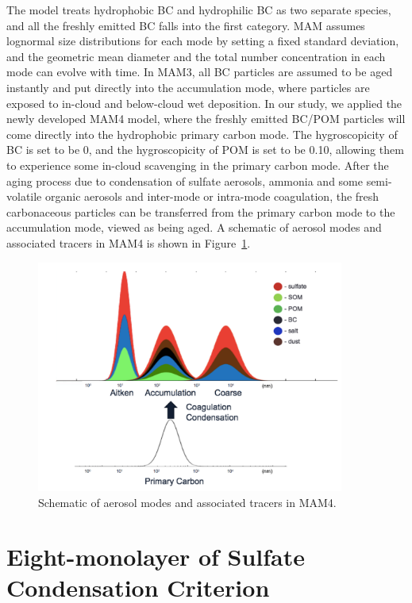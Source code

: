 \documentclass[12pt, fullpage]{uiucthesis2009}
\begin{document}
	
	The model treats hydrophobic BC and hydrophilic BC as two separate species, and all the freshly emitted BC falls into the first category. MAM assumes lognormal size distributions for each mode by setting a fixed standard deviation, and the geometric mean diameter and the total number concentration in each mode can evolve with time. In MAM3, all BC particles are assumed to be aged instantly and put directly into the accumulation mode, where particles are exposed to in-cloud and below-cloud wet deposition. In our study, we applied the newly developed MAM4 model, where the freshly emitted BC/POM particles will come directly into the hydrophobic primary carbon mode. The hygroscopicity of BC is set to be 0, and the hygroscopicity of POM is set to be 0.10, allowing them to experience some in-cloud scavenging in the primary carbon mode. After the aging process due to condensation of sulfate aerosols, ammonia and some semi-volatile organic aerosols and inter-mode or intra-mode coagulation, the fresh carbonaceous particles can be transferred from the primary carbon mode to the accumulation mode, viewed as being aged. A schematic of aerosol modes and associated tracers in MAM4 is shown in Figure~\ref{fig_P1}.
	\begin{figure}[h] 
		\begin{center}
			\includegraphics[width = 0.9\textwidth]{Figure01}
			\caption[Schematic of aerosol modes and associated tracers in MAM4]{\label{fig_P1} Schematic of aerosol modes and associated tracers in MAM4.}
		\end{center}
	\end{figure}
	
	
	\section{Eight-monolayer of Sulfate Condensation Criterion}\label{sec_2}
		
\end{document}

